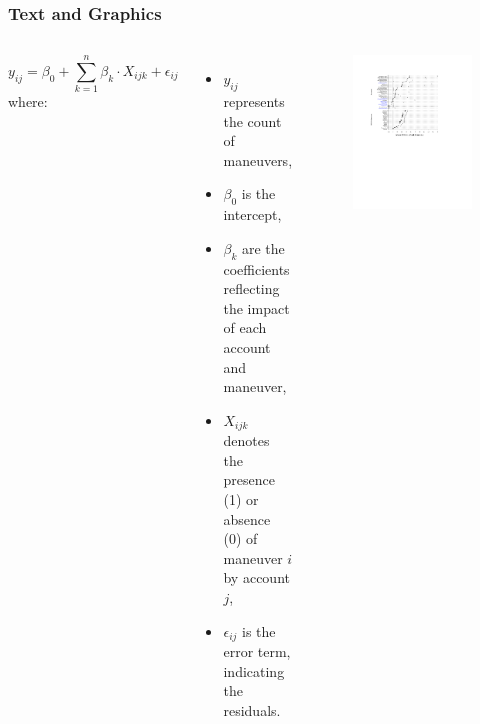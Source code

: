 \documentclass[t, aspectratio=169]{beamer}
\begin{document}
\begin{frame}
    \frametitle{Text and Graphics}
    \begin{columns}[T]
    \vspace{-1em} %
    {\footnotesize %
    \begin{equation*}
        y_{ij} = \beta_0 + \sum_{k=1}^{n} \beta_{k} \cdot X_{ijk} + \epsilon_{ij}
    \end{equation*}
     \vspace{-0.9em} %
    where:
    \begin{itemize}
        \setlength\itemsep{1em} %
        \item[] \(y_{ij}\) represents the count of maneuvers,
        \item[] \(\beta_0\) is the intercept,
        \item[] \(\beta_k\) are the coefficients reflecting the impact of each account and maneuver,
        \item[] \(X_{ijk}\) denotes the presence (1) or absence (0) of maneuver \(i\) by account \(j\),
        \item[] \(\epsilon_{ij}\) is the error term, indicating the residuals.
    \end{itemize}
    }

    \begin{figure}
        \centering %
        \includegraphics[width=0.9\linewidth, keepaspectratio]{Balikatan_2022_BEND_Media_Main_Effects.pdf}%
        \caption*{}
        \label{}
    \end{figure}
    \end{columns}
\end{frame}
\end{document}
